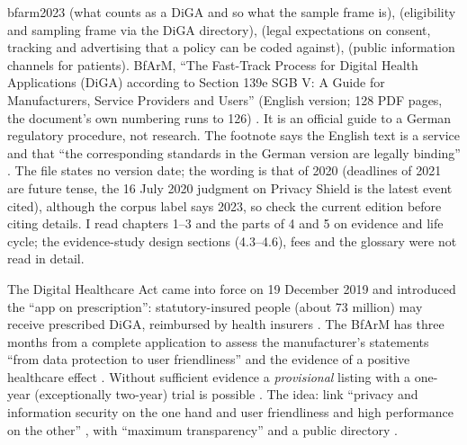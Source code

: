 \begin{papercard}{bfarm2023}
  (what counts as a DiGA and so what the sample frame is),  (eligibility and sampling frame via the DiGA directory),  (legal expectations on consent, tracking and advertising that a policy can be coded against),  (public information channels for patients). BfArM, ``The Fast-Track Process for Digital Health Applications (DiGA) according to Section 139e SGB V: A Guide for Manufacturers, Service Providers and Users'' (English version; 128 PDF pages, the document's own numbering runs to 126) . It is an official guide to a German regulatory procedure, not research. The footnote says the English text is a service and that ``the corresponding standards in the German version are legally binding'' . The file states no version date; the wording is that of 2020 (deadlines of 2021 are future tense, the 16 July 2020 judgment on Privacy Shield is the latest event cited), although the corpus label says 2023, so check the current edition before citing details. I read chapters 1--3 and the parts of 4 and 5 on evidence and life cycle; the evidence-study design sections (4.3--4.6), fees and the glossary were not read in detail.

 The Digital Healthcare Act came into force on 19 December 2019 and introduced the ``app on prescription'': statutory-insured people (about 73 million) may receive prescribed DiGA, reimbursed by health insurers . The BfArM has three months from a complete application to assess the manufacturer's statements ``from data protection to user friendliness'' and the evidence of a positive healthcare effect . Without sufficient evidence a \emph{provisional} listing with a one-year (exceptionally two-year) trial is possible . The idea: link ``privacy and information security on the one hand and user friendliness and high performance on the other'' , with ``maximum transparency'' and a public directory .


\end{papercard}
